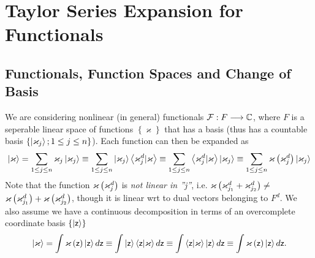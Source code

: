                       


\section{Taylor Series Expansion for Functionals}

\subsection{Functionals, Function Spaces and Change of Basis}

We are considering nonlinear (in general) functionals ${\cal F}%
:F\longrightarrow {\Bbb C}$, where $F$ is a seperable linear space of
functions $\left\{ \varkappa \right\} $ that has a basis (thus has a
countable basis $\left\{ \left| {\bf \varkappa }_{j}\right\rangle ;1\leq
j\leq n\right\} $). Each function can then be expanded as 
\begin{equation}
\left| \varkappa \right\rangle =\sum_{1\leq j\leq n}\varkappa _{j}\left| 
{\bf \varkappa }_{j}\right\rangle \equiv \sum_{1\leq j\leq n}\left| {\bf %
\varkappa }_{j}\right\rangle \left\langle {\bf \varkappa }_{j}^{d}|\varkappa
\right\rangle \equiv \sum_{1\leq j\leq n}\left\langle {\bf \varkappa }%
_{j}^{d}|\varkappa \right\rangle \left| {\bf \varkappa }_{j}\right\rangle
\equiv \sum_{1\leq j\leq n}\varkappa \left( {\bf \varkappa }_{j}^{d}\right)
\left| {\bf \varkappa }_{j}\right\rangle
\end{equation}%
Note that the function $\varkappa \left( {\bf \varkappa }_{j}^{d}\right) $
is {\em not linear in ''j''}, i.e. $\varkappa \left( {\bf \varkappa }%
_{j_{1}}^{d}+{\bf \varkappa }_{j_{2}}^{d}\right) \neq ${\em \ }$\varkappa
\left( {\bf \varkappa }_{j_{1}}^{d}\right) +\varkappa \left( {\bf \varkappa }%
_{j_{2}}^{d}\right) $, though it is linear wrt to dual vectors belonging to $%
F^{d}$. We also assume we have a continuous decomposition in terms of an
overcomplete coordinate basis $\left\{ \left| {\sf z}\right\rangle \right\} $
\begin{equation}
\left| \varkappa \right\rangle =\int \varkappa \left( {\sf z}\right) \left| 
{\sf z}\right\rangle d{\sf z}\equiv \int \left| {\sf z}\right\rangle
\left\langle {\sf z}|\varkappa \right\rangle d{\sf z}\equiv \int
\left\langle {\sf z}|\varkappa \right\rangle \left| {\sf z}\right\rangle d%
{\sf z}\equiv \int \varkappa \left( {\sf z}\right) \left| {\sf z}%
\right\rangle d{\sf z.}
\end{equation}%
